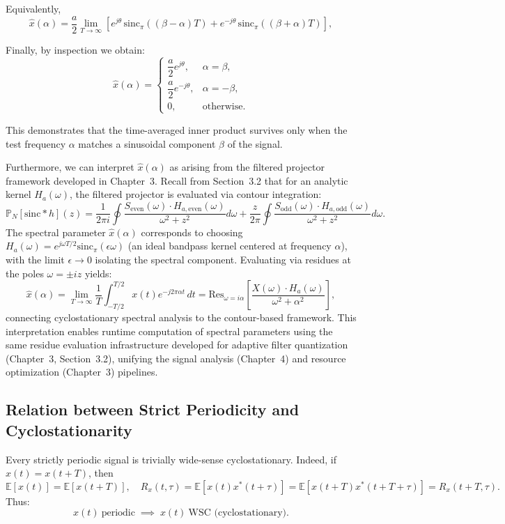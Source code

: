 Equivalently,
\[
\hat{x}(\alpha) = \frac{a}{2}\lim_{T \to \infty}\left[e^{j\theta}\,\mathrm{sinc}_\pi((\beta-\alpha)T)
+ e^{-j\theta}\,\mathrm{sinc}_\pi((\beta+\alpha)T)\right],
\]

Finally, by inspection we obtain:
\[
\hat{x}(\alpha) =
\begin{cases}
	\dfrac{a}{2}e^{j\theta}, & \alpha = \beta,\\[6pt]
	\dfrac{a}{2}e^{-j\theta}, & \alpha = -\beta,\\[6pt]
	0, & \text{otherwise}.
\end{cases}
\]

This demonstrates that the time-averaged inner product survives only when the test frequency $\alpha$ matches a sinusoidal component $\beta$ of the signal.
\medskip

\noindent Furthermore, we can interpret $\hat{x}(\alpha)$ as arising from the filtered projector framework developed in Chapter~3. Recall from Section~3.2 that for an analytic kernel $H_a(\omega)$, the filtered projector is evaluated via contour integration:
\[
\mathbb{P}_N[\text{sinc} * h](z) = \frac{1}{2\pi i}\oint \frac{S_{\text{even}}(\omega) \cdot H_{a,\text{even}}(\omega)}{\omega^2+z^2} d\omega + \frac{z}{2\pi}\oint \frac{S_{\text{odd}}(\omega) \cdot H_{a,\text{odd}}(\omega)}{\omega^2+z^2} d\omega.
\]
The spectral parameter $\hat{x}(\alpha)$ corresponds to choosing $H_a(\omega) = e^{j\omega T/2}\mathrm{sinc}_\pi(\epsilon\omega)$ (an ideal bandpass kernel centered at frequency $\alpha$), with the limit $\epsilon \to 0$ isolating the spectral component. Evaluating via residues at the poles $\omega = \pm iz$ yields:
\[
\hat{x}(\alpha) = \lim_{T \to \infty} \frac{1}{T} \int_{-T/2}^{T/2} x(t) e^{-j2\pi\alpha t} \, dt = \text{Res}_{\omega = i\alpha} \left[\frac{X(\omega) \cdot H_a(\omega)}{\omega^2 + \alpha^2}\right],
\]
connecting cyclostationary spectral analysis to the contour-based framework. This interpretation enables runtime computation of spectral parameters using the same residue evaluation infrastructure developed for adaptive filter quantization (Chapter~3, Section~3.2), unifying the signal analysis (Chapter~4) and resource optimization (Chapter~3) pipelines.

\subsection{Relation between Strict Periodicity and Cyclostationarity}

Every strictly periodic signal is trivially wide-sense cyclostationary.
Indeed, if $x(t) = x(t+T)$, then
\[
\mathbb{E}[x(t)] = \mathbb{E}[x(t+T)], \quad
R_x(t,\tau) = \mathbb{E}[x(t)x^*(t+\tau)] = \mathbb{E}[x(t+T)x^*(t+T+\tau)] = R_x(t+T,\tau).
\]
Thus:
\[
x(t)\ \text{periodic} \;\implies\; x(t)\ \text{WSC (cyclostationary)}.
\]

